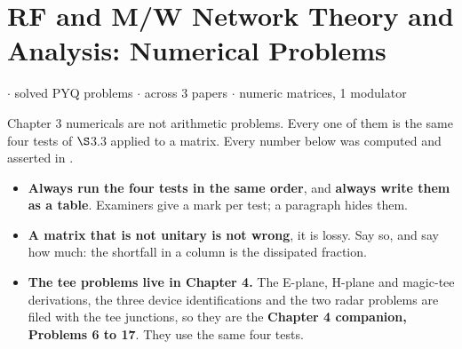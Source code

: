 \section{RF and M/W Network Theory and Analysis: Numerical Problems}
{\color{sub}\footnotesize {} \gap$\cdot$ solved PYQ problems \gap$\cdot$\gap
across 3 papers \gap$\cdot$ numeric matrices, 1 modulator}

\vspace{3pt}\noindent
\colorbox{gdL}{\makebox[\dimexpr\textwidth-2\fboxsep][l]{%
  \textcolor{gd}{\bfseries\footnotesize READ THIS FIRST}}}
\par\nobreak\vspace{3pt}

Chapter 3 numericals are not arithmetic problems. Every one of them is the same
four tests of $\S$3.3 applied to a matrix.  Every number below was computed and asserted in .

\begin{itemize}
  \item \textbf{Always run the four tests in the same order}, and \textbf{always write them
    as a table}. Examiners give a mark per test; a paragraph hides them.
  \item \textbf{A matrix that is not unitary is not wrong}, it is lossy. Say so, and say
    how much: the shortfall in a column is the dissipated fraction.
  \item \textbf{The tee problems live in Chapter 4.} The E-plane, H-plane and magic-tee
    derivations, the three device identifications and the two radar problems are filed
    with the tee junctions, so they are the \textbf{Chapter 4 companion, Problems 6 to 17}.
    They use the same four tests.
\end{itemize}

\hr


